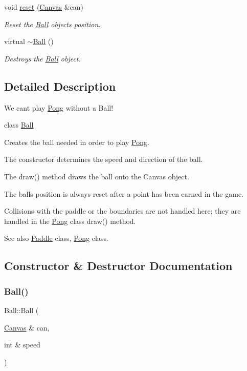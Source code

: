 \begin{DoxyCompactItemize}
void \hyperlink{class_ball_a12dad22dfdba8e2b92ae74464001d55f}{reset} (\hyperlink{classtsgl_1_1_canvas}{Canvas} \&can)
\begin{DoxyCompactList}\small\item\em Reset the \hyperlink{class_ball}{Ball} object\textquotesingle{}s position. \end{DoxyCompactList}\item 
\mbox{\label{class_ball_a78aa1f06b39fc9f81df82bef399c475c}} 
virtual \hyperlink{class_ball_a78aa1f06b39fc9f81df82bef399c475c}{$\sim$\+Ball} ()
\begin{DoxyCompactList}\small\item\em Destroys the \hyperlink{class_ball}{Ball} object. \end{DoxyCompactList}\end{DoxyCompactItemize}


\subsection{Detailed Description}
We can\textquotesingle{}t play \hyperlink{class_pong}{Pong} without a Ball! 

class \hyperlink{class_ball}{Ball}

Creates the ball needed in order to play \hyperlink{class_pong}{Pong}.

The constructor determines the speed and direction of the ball.

The draw() method draws the ball onto the Canvas object.

The ball\textquotesingle{}s position is always reset after a point has been earned in the game.

Collisions with the paddle or the boundaries are not handled here; they are handled in the \hyperlink{class_pong}{Pong} class\textquotesingle{} draw() method. \begin{DoxySeeAlso}{See also}
\hyperlink{class_paddle}{Paddle} class, \hyperlink{class_pong}{Pong} class. 
\end{DoxySeeAlso}


\subsection{Constructor \& Destructor Documentation}
\mbox{\label{class_ball_a463d1350ad5150bf628d6c8f35f3ae64}} 
\subsubsection{\texorpdfstring{Ball()}{Ball()}}
{\footnotesize\ttfamily Ball\+::\+Ball (\begin{DoxyParamCaption}\item[{\hyperlink{classtsgl_1_1_canvas}{Canvas} \&}]{can,  }\item[{int \&}]{speed }\end{DoxyParamCaption})}



